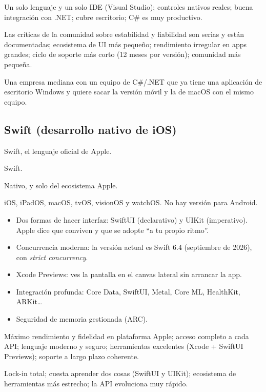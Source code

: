  Un solo lenguaje y un solo IDE (Visual Studio); controles nativos reales; buena integración con .NET; cubre escritorio; C\# es muy productivo.

 Las críticas de la comunidad sobre estabilidad y fiabilidad son serias y están documentadas; ecosistema de UI más pequeño; rendimiento irregular en apps grandes; ciclo de soporte más corto (12 meses por versión); comunidad más pequeña.

 Una empresa mediana con un equipo de C\#/.NET que ya tiene una aplicación de escritorio Windows y quiere sacar la versión móvil y la de macOS con el mismo equipo.

\subsection{Swift (desarrollo nativo de iOS)}

 Swift, el lenguaje oficial de Apple.

 Swift.

 Nativo, y solo del ecosistema Apple.

 iOS, iPadOS, macOS, tvOS, visionOS y watchOS. No hay versión para Android.

\begin{itemize}[leftmargin=*,itemsep=0.2em,topsep=0.2em]
  \item Dos formas de hacer interfaz: SwiftUI (declarativo) y UIKit (imperativo). Apple dice que conviven y que se adopte \enquote{a tu propio ritmo}.
  \item Concurrencia moderna: la versión actual es Swift 6.4 (septiembre de 2026), con \emph{strict concurrency}.
  \item Xcode Previews: ves la pantalla en el canvas lateral sin arrancar la app.
  \item Integración profunda: Core Data, SwiftUI, Metal, Core ML, HealthKit, ARKit\ldots
  \item Seguridad de memoria gestionada (ARC).
\end{itemize}

 Máximo rendimiento y fidelidad en plataforma Apple; acceso completo a cada API; lenguaje moderno y seguro; herramientas excelentes (Xcode + SwiftUI Previews); soporte a largo plazo coherente.

 Lock-in total; cuesta aprender dos cosas (SwiftUI y UIKit); ecosistema de herramientas más estrecho; la API evoluciona muy rápido.

